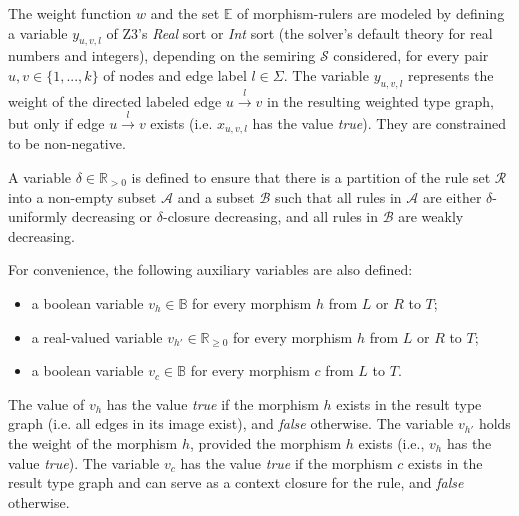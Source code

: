 The weight function $w$ and the set $\mathbb{E}$ of morphism-rulers are modeled by defining 
a variable $y_{u,v,l}$ of Z3's \textit{Real} sort or \textit{Int} sort (the solver's default theory for real numbers and integers), depending on the semiring $\mathcal{S}$ considered,
 for every pair $u,v\in\{1,...,k\}$ of nodes and edge label $l \mathop{\in} \Sigma$. 
The variable $y_{u,v,l}$ represents the weight of the directed labeled edge $u\overset{l}{\to} v$ in the resulting weighted type graph, but only if edge $u\overset{l}{\to} v$ exists (i.e. $x_{u,v,l}$ has the value \textit{true}). 
They are constrained to be non-negative.

A variable $\delta \mathop{\in} \mathbb{R}_{>0}$ is defined to ensure that there is
a partition of the rule set $\mathcal{R}$ into a non-empty subset $\mathcal{A}$ and a subset $\mathcal{B}$ such that all rules in $\mathcal{A}$ are either $\delta$-uniformly decreasing or $\delta$-closure decreasing, and all rules in $\mathcal{B}$ are weakly decreasing.

For convenience, the following auxiliary variables are also defined:
\begin{itemize}
    \item a boolean variable $v_h \mathop{\in} \mathbb{B}$ for every morphism $h$ from $L$ or $R$ to $T$;
    \item a real-valued variable $v_{h'} \mathop{\in} \mathbb{R}_{\geq 0}$ for every morphism $h$ from $L$ or $R$ to $T$;
    \item a boolean variable $v_c \mathop{\in} \mathbb{B}$ for every morphism $c$ from $L$ to $T$.
\end{itemize}  
The value of $v_h$ has the value \textit{true} if the morphism $h$ exists in the result type graph (i.e. all edges in its image exist), and \textit{false} otherwise.
The variable $v_{h'}$ holds the weight of the morphism $h$, provided the morphism $h$ exists (i.e., $v_h$ has the value \textit{true}).
The variable $v_c$ has the value \textit{true} if the morphism $c$ exists in the result type graph and can serve as a context closure for the rule, and \textit{false} otherwise.

